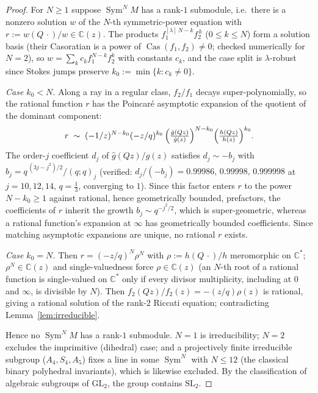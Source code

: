 \documentclass[11pt]{article}
\theoremstyle{plain}
\theoremstyle{definition}
\theoremstyle{remark}
\newcommand{\C}{\mathbb{C}}
\begin{document}
\begin{proof}
For $N\ge1$ suppose $\operatorname{Sym}^N\!M$ has a rank-$1$ submodule, i.e.\ there is a nonzero
solution $w$ of the $N$-th symmetric-power equation with $r:=w(Q\,\cdot)/w\in\C(z)$. The products
$f_1^{[\lambda]\,N-k}f_2^{\,k}$ ($0\le k\le N$) form a solution basis (their Casoratian is a power
of $\operatorname{Cas}(f_1,f_2)\ne0$; checked numerically for $N=2$), so
$w=\sum_kc_kf_1^{N-k}f_2^k$ with constants $c_k$, and the case split is $\lambda$-robust since
Stokes jumps preserve $k_0:=\min\{k:c_k\ne0\}$.

\emph{Case $k_0<N$.} Along a ray in a regular class, $f_2/f_1$ decays super-polynomially, so the
rational function $r$ has the Poincar\'e asymptotic expansion of the quotient of the dominant
component:
\[
   r\;\sim\;(-1/z)^{N-k_0}(-z/q)^{k_0}\,
   \Bigl(\tfrac{\hat g(Qz)}{\hat g(z)}\Bigr)^{N-k_0}
   \Bigl(\tfrac{h(Qz)}{h(z)}\Bigr)^{k_0}.
\]
The order-$j$ coefficient $d_j$ of $\hat g(Qz)/\hat g(z)$ satisfies
$d_j\sim-b_j$ with $b_j=q^{\,(3j-j^2)/2}/(q;q)_j$ (verified: $d_j/(-b_j)=0.99986,\,0.99998,\,
0.999998$ at $j=10,12,14$, $q=\tfrac13$, converging to $1$). Since this factor enters $r$ to the
power $N-k_0\ge1$ against rational, hence geometrically bounded, prefactors, the coefficients of $r$
inherit the growth $b_j\sim q^{-j^2/2}$, which is super-geometric, whereas a rational function's
expansion at $\infty$ has geometrically bounded coefficients. Since matching asymptotic
expansions are unique, no rational $r$ exists.

\emph{Case $k_0=N$.} Then $r=(-z/q)^N\rho^N$ with $\rho:=h(Q\,\cdot)/h$ meromorphic on $\C^*$;
$\rho^N\in\C(z)$ and single-valuedness force $\rho\in\C(z)$ (an $N$-th root of a rational function
is single-valued on $\C^*$ only if every divisor multiplicity, including at $0$ and $\infty$, is
divisible by $N$). Then $f_2(Qz)/f_2(z)=-(z/q)\rho(z)$ is rational, giving a rational solution of
the rank-$2$ Riccati equation; contradicting Lemma~\ref{lem:irreducible}.

Hence no $\operatorname{Sym}^N\!M$ has a rank-$1$ submodule. $N=1$ is irreducibility; $N=2$
excludes the imprimitive (dihedral) case; and a projectively finite irreducible subgroup
($A_4,S_4,A_5$) fixes a line in some $\operatorname{Sym}^N$ with $N\le12$ (the classical binary
polyhedral invariants), which is likewise excluded. By the classification of algebraic subgroups of
$\mathrm{GL}_2$, the group contains $\mathrm{SL}_2$.
\end{proof}
\end{document}
